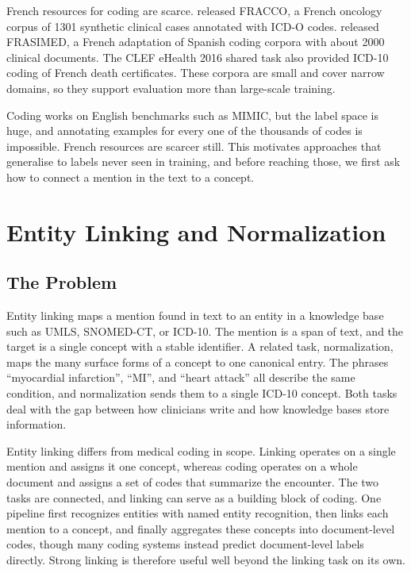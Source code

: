 French resources for coding are scarce. \citet{pignat2024fracco} released FRACCO, a French
oncology corpus of 1301 synthetic clinical cases annotated with ICD-O codes. \citet{zaghir2023frasimed}
released FRASIMED, a French adaptation of Spanish coding corpora with about 2000 clinical
documents. The CLEF eHealth 2016 shared task also provided ICD-10 coding of French death
certificates. These corpora are small and cover narrow domains, so they support evaluation
more than large-scale training.

Coding works on English benchmarks such as MIMIC, but the label space is huge, and annotating
examples for every one of the thousands of codes is impossible. French resources are scarcer
still. This motivates approaches that generalise to labels never seen in training, and before
reaching those, we first ask how to connect a mention in the text to a concept.
\section{Entity Linking and Normalization}
\label{sec:ie-linking}

\subsection{The Problem}

Entity linking maps a mention found in text to an entity in a knowledge base such as UMLS,
SNOMED-CT, or ICD-10. The mention is a span of text, and the target is a single concept with a
stable identifier. A related task, normalization, maps the many surface forms of a concept to
one canonical entry. The phrases ``myocardial infarction'', ``MI'', and ``heart attack'' all
describe the same condition, and normalization sends them to a single ICD-10 concept. Both
tasks deal with the gap between how clinicians write and how knowledge bases store information.

Entity linking differs from medical coding in scope. Linking operates on a single mention and
assigns it one concept, whereas coding operates on a whole document and assigns a set of codes
that summarize the encounter. The two tasks
are connected, and linking can serve as a building block of coding. One pipeline first
recognizes entities with named entity recognition, then links each mention to a concept, and
finally aggregates these concepts into document-level codes, though many coding systems instead
predict document-level labels directly. Strong linking is therefore useful well beyond the
linking task on its own.

